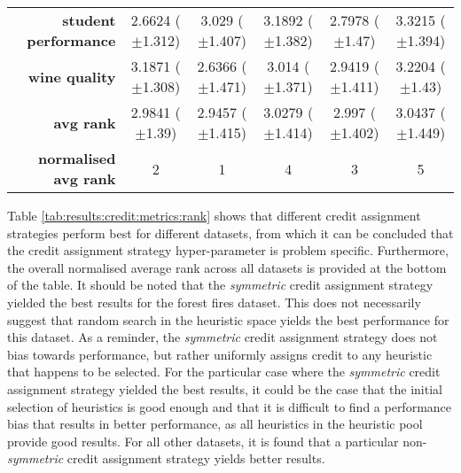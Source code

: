 \begin{table}[htb]
{\begin{tabular}{r|ccccc}
			\textbf{student performance} & \cellcolor[rgb]{ .388,  .745,  .482}2.6624 ($\pm$1.312) & \cellcolor[rgb]{ 1,  .922,  .518}3.029 ($\pm$1.407)     & \cellcolor[rgb]{ .988,  .643,  .467}3.1892 ($\pm$1.382) & \cellcolor[rgb]{ .612,  .808,  .494}2.7978 ($\pm$1.47)  & \cellcolor[rgb]{ .973,  .412,  .42}3.3215 ($\pm$1.394)  \\
			\textbf{wine quality}        & \cellcolor[rgb]{ .98,  .494,  .439}3.1871 ($\pm$1.308)  & \cellcolor[rgb]{ .388,  .745,  .482}2.6366 ($\pm$1.471) & \cellcolor[rgb]{ 1,  .922,  .518}3.014 ($\pm$1.371)     & \cellcolor[rgb]{ .882,  .886,  .51}2.9419 ($\pm$1.411)  & \cellcolor[rgb]{ .973,  .412,  .42}3.2204 ($\pm$1.43)   \\
			\midrule
			\textbf{avg rank}            & \cellcolor[rgb]{ .843,  .875,  .506}2.9841 ($\pm$1.39)  & \cellcolor[rgb]{ .388,  .745,  .482}2.9457 ($\pm$1.415) & \cellcolor[rgb]{ .984,  .588,  .455}3.0279 ($\pm$1.414) & \cellcolor[rgb]{ 1,  .922,  .518}2.997 ($\pm$1.402)     & \cellcolor[rgb]{ .973,  .412,  .42}3.0437 ($\pm$1.449)  \\
			\midrule
			\textbf{normalised avg rank} & \cellcolor[rgb]{ .694,  .831,  .498}2                   & \cellcolor[rgb]{ .388,  .745,  .482}1                   & \cellcolor[rgb]{ .988,  .667,  .471}4                   & \cellcolor[rgb]{ 1,  .922,  .518}3                      & \cellcolor[rgb]{ .973,  .412,  .42}5                    \\
		\end{tabular}%

	}
\end{table}%

Table \ref{tab:results:credit:metrics:rank} shows that different credit assignment strategies perform best for different datasets, from which it can be concluded that the credit assignment strategy hyper-parameter is problem specific. Furthermore, the overall normalised average rank across all datasets is provided at the bottom of the table. It should be noted that the \textit{symmetric} credit assignment strategy yielded the best results for the forest fires dataset. This does not necessarily suggest that random search in the heuristic space yields the best performance for this dataset. As a reminder, the \textit{symmetric} credit assignment strategy does not bias towards performance, but rather uniformly assigns credit to any heuristic that happens to be selected. For the particular case where the \textit{symmetric} credit assignment strategy yielded the best results, it could be the case that the initial selection of heuristics is good enough and that it is difficult to find a performance bias that results in better performance, as all heuristics in the heuristic pool provide good results. For all other datasets, it is found that a particular non-\textit{symmetric} credit assignment strategy yields better results.

